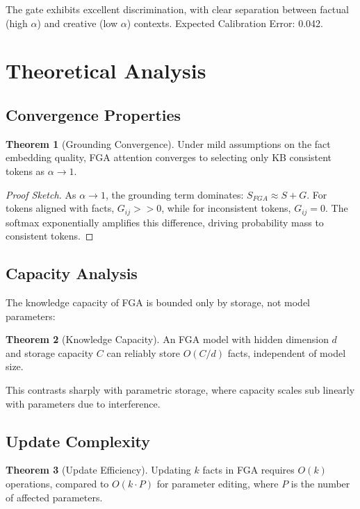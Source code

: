 \documentclass[11pt, a4paper]{article}
\theoremstyle{definition}
\newtheorem{theorem}{Theorem}
\begin{document}
The gate exhibits excellent discrimination, with clear separation between factual (high $\alpha$) and creative (low $\alpha$) contexts. Expected Calibration Error: 0.042.

\section{Theoretical Analysis}

\subsection{Convergence Properties}

\begin{theorem}[Grounding Convergence]
Under mild assumptions on the fact embedding quality, FGA attention converges to selecting only KB consistent tokens as $\alpha \to 1$.
\end{theorem}

\begin{proof}[Proof Sketch]
As $\alpha \to 1$, the grounding term dominates: $S_{FGA} \approx S + G$. For tokens aligned with facts, $G_{ij} >> 0$, while for inconsistent tokens, $G_{ij} = 0$. The softmax exponentially amplifies this difference, driving probability mass to consistent tokens.
\end{proof}

\subsection{Capacity Analysis}

The knowledge capacity of FGA is bounded only by storage, not model parameters:

\begin{theorem}[Knowledge Capacity]
An FGA model with hidden dimension $d$ and storage capacity $C$ can reliably store $O(C/d)$ facts, independent of model size.
\end{theorem}

This contrasts sharply with parametric storage, where capacity scales sub linearly with parameters due to interference.

\subsection{Update Complexity}

\begin{theorem}[Update Efficiency]
Updating $k$ facts in FGA requires $O(k)$ operations, compared to $O(k \cdot P)$ for parameter editing, where $P$ is the number of affected parameters.
\end{theorem}
\end{document}
